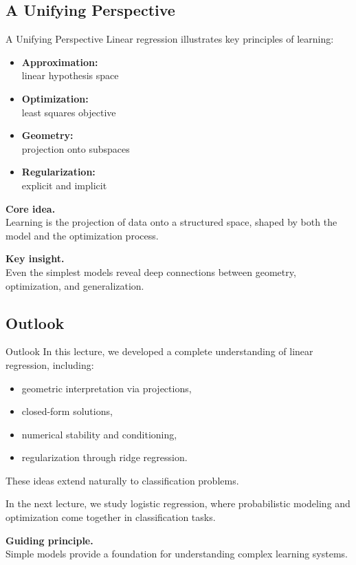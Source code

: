 \documentclass[aspectratio=169,11pt]{beamer}
\begin{document}
\subsection{A Unifying Perspective}
\begin{frame}[t,allowframebreaks]{A Unifying Perspective}
\small
Linear regression illustrates key principles of learning:

\begin{itemize}
    \item \textbf{Approximation:}\\ linear hypothesis space
    \item \textbf{Optimization:}\\ least squares objective
    \item \textbf{Geometry:}\\ projection onto subspaces
    \item \textbf{Regularization:}\\ explicit and implicit
\end{itemize}

\textbf{Core idea.}\\ Learning is the projection of data onto a structured space, shaped by both the model and the optimization process.

\textbf{Key insight.}\\ Even the simplest models reveal deep connections between geometry, optimization, and generalization.
\end{frame}

\subsection{Outlook}
\begin{frame}[t,allowframebreaks]{Outlook}
\small
In this lecture, we developed a complete understanding of linear regression, including:

\begin{itemize}
    \item geometric interpretation via projections,
    \item closed-form solutions,
    \item numerical stability and conditioning,
    \item regularization through ridge regression.
\end{itemize}

These ideas extend naturally to classification problems.

In the next lecture, we study logistic regression, where probabilistic modeling and optimization come together in classification tasks.

\textbf{Guiding principle.}\\ Simple models provide a foundation for understanding complex learning systems.
\end{frame}
\end{document}
